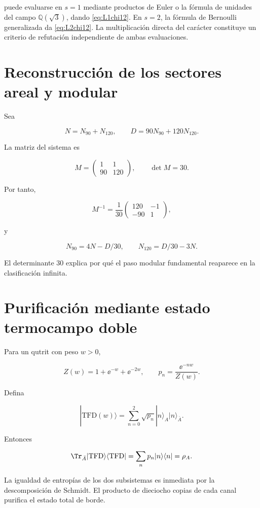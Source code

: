 puede evaluarse en \(s=1\) mediante productos de Euler o la f\'ormula de unidades del campo \(\mathbb Q(\sqrt3)\), dando \cref{eq:L1chi12}. En \(s=2\), la f\'ormula de Bernoulli generalizada da \cref{eq:L2chi12}. La multiplicaci\'on directa del car\'acter constituye un criterio de refutación independiente de ambas evaluaciones.

\section{Reconstrucci\'on de los sectores areal y modular}

Sea

\[
N=N_{90}+N_{120},\qquad D=90N_{90}+120N_{120}.
\]

La matriz del sistema es

\[
M=\begin{pmatrix}1&1\\90&120\end{pmatrix},
\qquad \det M=30.
\]

Por tanto,

\[
M^{-1}=\frac1{30}
\begin{pmatrix}120&-1\\-90&1\end{pmatrix},
\]

y

\[
N_{90}=4N-D/30,\qquad N_{120}=D/30-3N.
\]

El determinante \(30\) explica por qu\'e el paso modular fundamental reaparece en la clasificaci\'on infinita.

\section{Purificaci\'on mediante estado termocampo doble}

Para un qutrit con peso \(w>0\),

\[
Z(w)=1+\ee^{-w}+\ee^{-2w},
\qquad p_n=\frac{\ee^{-nw}}{Z(w)}.
\]

Defina

\[
|\mathrm{TFD}(w)\rangle=\sum_{n=0}^2\sqrt{p_n}
|n\rangle_A|n\rangle_{\bar A}.
\]

Entonces

\[
\Tr_{\bar A}|\mathrm{TFD}\rangle\langle\mathrm{TFD}|
=\sum_np_n|n\rangle\langle n|=\rho_A.
\]

La igualdad de entrop\'ias de los dos subsistemas es inmediata por la descomposici\'on de Schmidt. El producto de dieciocho copias de cada canal purifica el estado total de borde.

